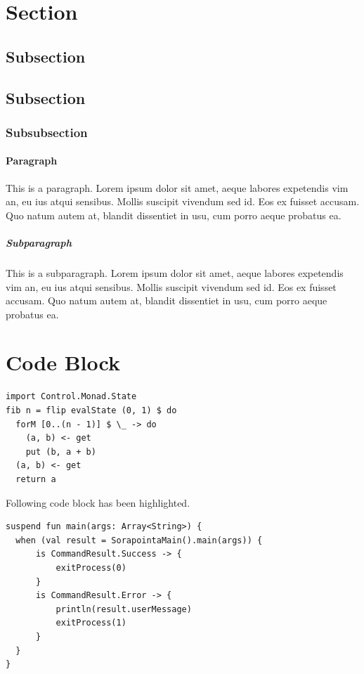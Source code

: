 \documentclass{report}
\theoremstyle{definition}
\begin{document}
\section{Section}

\subsection{Subsection}
\subsection{Subsection}
\subsubsection{Subsubsection}

\paragraph{Paragraph} This is a paragraph.  Lorem ipsum dolor sit amet, aeque labores expetendis vim an, eu ius atqui sensibus. Mollis suscipit vivendum sed id. Eos ex fuisset accusam. Quo natum autem at, blandit dissentiet in usu, cum porro aeque probatus ea.
\subparagraph{Subparagraph} This is a subparagraph. Lorem ipsum dolor sit amet, aeque labores expetendis vim an, eu ius atqui sensibus. Mollis suscipit vivendum sed id. Eos ex fuisset accusam. Quo natum autem at, blandit dissentiet in usu, cum porro aeque probatus ea.

\newpage
\section{Code Block}

\begin{verbatim}
import Control.Monad.State
fib n = flip evalState (0, 1) $ do
  forM [0..(n - 1)] $ \_ -> do
    (a, b) <- get
    put (b, a + b)
  (a, b) <- get
  return a
\end{verbatim}

Following code block has been highlighted.

\begin{verbatim}
suspend fun main(args: Array<String>) {
  when (val result = SorapointaMain().main(args)) {
      is CommandResult.Success -> {
          exitProcess(0)
      }
      is CommandResult.Error -> {
          println(result.userMessage)
          exitProcess(1)
      }
  }
}
\end{verbatim}
\end{document}
